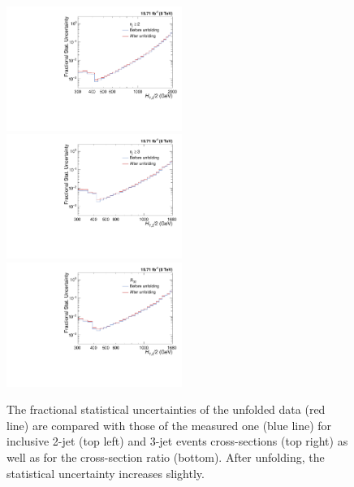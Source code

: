 \begin{figure}[!ht]
 \begin{center}
 \hspace*{-3mm}\includegraphics[width=0.51\textwidth]{Plots_HT_2_150/Comparison_stat_unc_2_HT_2_150.pdf}%
 ~~\includegraphics[width=0.51\textwidth]{Plots_HT_2_150/Comparison_stat_unc_3_HT_2_150.pdf}\\
 \includegraphics[width=0.51\textwidth]{Plots_HT_2_150/Comparison_stat_unc_ratio_32_symm.pdf}
 \caption{The fractional statistical uncertainties of the unfolded data (red line) are compared with those of the measured one (blue line) for inclusive 2-jet (top left) and 3-jet events cross-sections (top right) as well as for the cross-section ratio \ratio (bottom). After unfolding, the statistical uncertainty increases slightly.}
 \label{fig:stat_unc}
 \end{center}
\end{figure}

